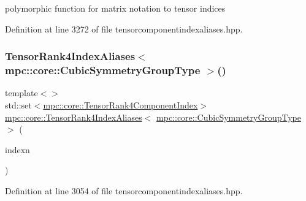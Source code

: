 polymorphic function for matrix notation to tensor indices 



Definition at line 3272 of file tensorcomponentindexaliases.\+hpp.

\mbox{\label{namespacempc_1_1core_ad81cccb6866982c1a9ce3591a7a9596e}} 
\subsubsection{\texorpdfstring{Tensor\+Rank4\+Index\+Aliases$<$ mpc\+::core\+::\+Cubic\+Symmetry\+Group\+Type $>$()}{TensorRank4IndexAliases< mpc::core::CubicSymmetryGroupType >()}}
{\footnotesize\ttfamily template$<$$>$ \\
std\+::set$<$\mbox{\hyperlink{namespacempc_1_1core_a54c081f41b2475abd10182bf023805d2}{mpc\+::core\+::\+Tensor\+Rank4\+Component\+Index}}$>$ \mbox{\hyperlink{namespacempc_1_1core_a40d1fb8009b3f7c34a6ea01a4b46027f}{mpc\+::core\+::\+Tensor\+Rank4\+Index\+Aliases}}$<$ \mbox{\hyperlink{structmpc_1_1core_1_1_cubic_symmetry_group_type}{mpc\+::core\+::\+Cubic\+Symmetry\+Group\+Type}} $>$ (\begin{DoxyParamCaption}\item[{const \mbox{\hyperlink{classmpc_1_1core_1_1_tensor_rank_n_component_index}{mpc\+::core\+::\+Tensor\+Rank\+N\+Component\+Index}}$<$ 4 $>$ \&}]{indexn }\end{DoxyParamCaption})\hspace{0.3cm}{\ttfamily [inline]}}



Definition at line 3054 of file tensorcomponentindexaliases.\+hpp.

\mbox{\label{namespacempc_1_1core_a10c87a52eecf7750cc80658d4ae62568}} 
